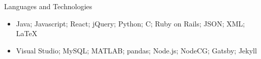 \documentclass[]{mcdowellcv}
\begin{document}
	\begin{cvsection}{Languages and Technologies}
		\begin{cvsubsection}{}{}{}	
			\begin{itemize}
				\item Java; Javascript; React; jQuery; Python; C; Ruby on Rails; JSON; XML; LaTeX
				\item Visual Studio; MySQL; MATLAB; pandas; Node.js; NodeCG; Gatsby; Jekyll
			\end{itemize}
		\end{cvsubsection}
	\end{cvsection}
	
\end{document}
